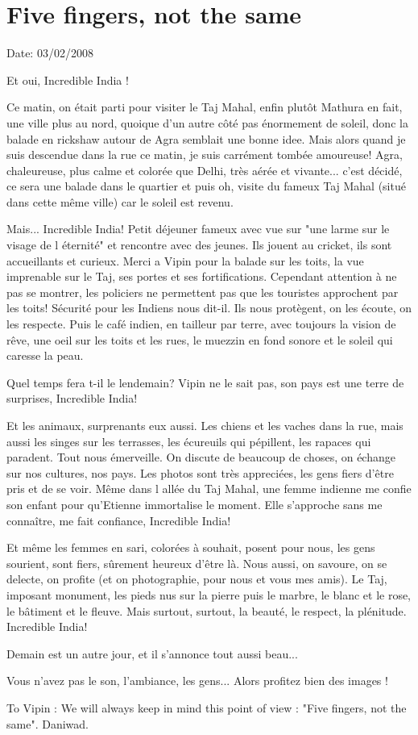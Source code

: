 \section{Five fingers, not the same}

Date: 03/02/2008

\begin{multicols}{2}

Et oui, Incredible India !

Ce matin, on était parti pour visiter le Taj Mahal, enfin plutôt Mathura en fait, une ville plus au nord, quoique d'un autre côté pas énormement de soleil, donc la balade en rickshaw autour de Agra semblait une bonne idee. Mais alors quand je suis descendue dans la rue ce matin, je suis carrément tombée amoureuse! Agra, chaleureuse, plus calme et colorée que Delhi, très aérée et vivante... c'est décidé, ce sera une balade dans le quartier et puis oh, visite du fameux Taj Mahal (situé dans cette même ville) car le soleil est revenu.

Mais... Incredible India! Petit déjeuner fameux avec vue sur "une larme sur le visage de l éternité" et rencontre avec des jeunes. Ils jouent au cricket, ils sont accueillants et curieux. Merci a Vipin pour la balade sur les toits, la vue imprenable sur le Taj, ses portes et ses fortifications. Cependant attention à ne pas se montrer, les policiers ne permettent pas que les touristes approchent par les toits! Sécurité pour les Indiens nous dit-il. Ils nous protègent, on les écoute, on les respecte. Puis le café indien, en tailleur par terre, avec toujours la vision de rêve, une oeil sur les toits et les rues, le muezzin en fond sonore et le soleil qui caresse la peau.

Quel temps fera t-il le lendemain? Vipin ne le sait pas, son pays est une terre de surprises, Incredible India!

Et les animaux, surprenants eux aussi. Les chiens et les vaches dans la rue, mais aussi les singes sur les terrasses, les écureuils qui pépillent, les rapaces qui paradent. Tout nous émerveille. On discute de beaucoup de choses, on échange sur nos cultures, nos pays. Les photos sont très appreciées, les gens fiers d'être pris et de se voir. Même dans l allée du Taj Mahal, une femme indienne me confie son enfant pour qu'Etienne immortalise le moment. Elle s'approche sans me connaître, me fait confiance, Incredible India!

Et même les femmes en sari, colorées à souhait, posent pour nous, les gens sourient, sont fiers, sûrement heureux d'être là. Nous aussi, on savoure, on se delecte, on profite (et on photographie, pour nous et vous mes amis). Le Taj, imposant monument, les pieds nus sur la pierre puis le marbre, le blanc et le rose, le bâtiment et le fleuve. Mais surtout, surtout, la beauté, le respect, la plénitude. Incredible India!

Demain est un autre jour, et il s'annonce tout aussi beau...

Vous n'avez pas le son, l'ambiance, les gens... Alors profitez bien des images !

To Vipin : We will always keep in mind this point of view : "Five fingers, not the same". Daniwad.

\end{multicols}
